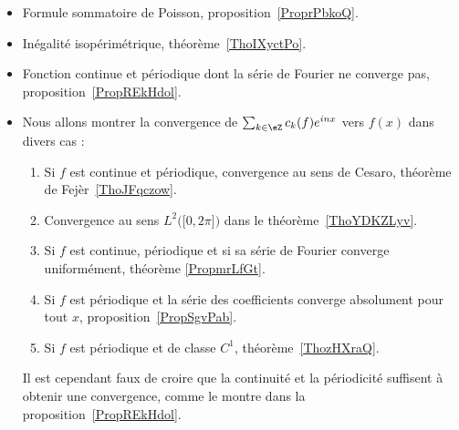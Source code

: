        \label{THMooHWEBooTMInve}
\begin{itemize}
    \item Formule sommatoire de Poisson, proposition~\ref{ProprPbkoQ}.
    \item Inégalité isopérimétrique, théorème~\ref{ThoIXyctPo}.
    \item Fonction continue et périodique dont la série de Fourier ne converge pas, proposition~\ref{PropREkHdol}.

    \item
Nous allons montrer la convergence de \( \sum_{k\in \eZ}c_k(f) e^{inx}\) vers \( f(x)\) dans divers cas :
\begin{enumerate}
    \item
        Si \( f\) est continue et périodique, convergence au sens de Cesaro, théorème de Fejèr~\ref{ThoJFqczow}.
    \item
        Convergence au sens \( L^2\Big( \mathopen[ 0 , 2\pi \mathclose] \Big)\) dans le théorème~\ref{ThoYDKZLyv}.
    \item
        Si \( f\) est continue, périodique et si sa série de Fourier converge uniformément, théorème \ref{PropmrLfGt}.
    \item
        Si \( f\) est périodique et la série des coefficients converge absolument pour tout \( x\), proposition~\ref{PropSgvPab}.
    \item
        Si \( f\) est périodique et de classe \( C^1\), théorème~\ref{ThozHXraQ}.
\end{enumerate}
Il est cependant faux de croire que la continuité et la périodicité suffisent à obtenir une convergence, comme le montre dans la proposition~\ref{PropREkHdol}.
\end{itemize}
